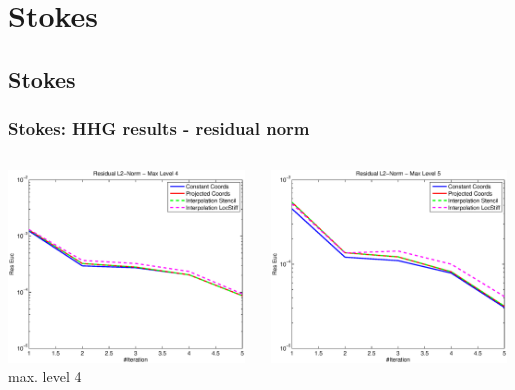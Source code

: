 \documentclass[t,compress=false,usepdftitle=false]{beamer}
\begin{document}
%
\section{Stokes}
\subsection{Stokes}
%
%
\begin{frame}\frametitle{Stokes: HHG results - residual norm}

\begin{columns}[T] 
\begin{column}[T]{4.3cm} 
  \centering
  \includegraphics[width=0.98\textwidth]{spherestokes_resEuc_level4}\\
  max. level 4
\end{column}\hfill
\begin{column}[T]{4.3cm} 
  \centering
  \includegraphics[width=0.98\textwidth]{spherestokes_resEuc_level5}\\

\end{column}
\end{columns}
\end{frame}
\end{document}
